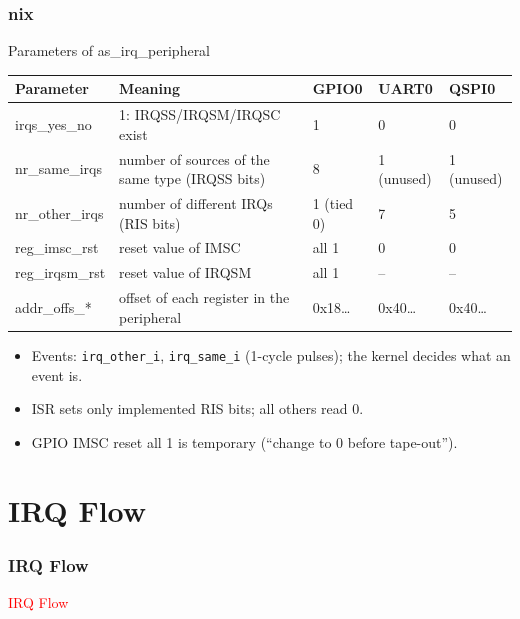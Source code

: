 \documentclass{beamer}
\newcommand{\astitle}{nix}
\newcommand{\assubtitle}{nix}
\newcommand{\cmd}[1]{\texttt{#1}}
\begin{document}
\renewcommand{\assubtitle}{Parameters of as\_irq\_peripheral}
\begin{frame}
\frametitle{\astitle}
\begin{block}{\assubtitle}
{\scriptsize
\begin{tabularx}{\textwidth}{|l|Y|l|l|l|}
  \hline
  \textbf{Parameter} & \textbf{Meaning} & \textbf{GPIO0} & \textbf{UART0} & \textbf{QSPI0} \\
  \hline
  \hline
  irqs\_yes\_no   & 1: IRQSS/IRQSM/IRQSC exist & 1 & 0 & 0 \\
  \hline
  nr\_same\_irqs  & number of sources of the same type (IRQSS bits) & 8 & 1 (unused) & 1 (unused) \\
  \hline
  nr\_other\_irqs & number of different IRQs (RIS bits) & 1 (tied 0) & 7 & 5 \\
  \hline
  reg\_imsc\_rst  & reset value of IMSC & all 1 & 0 & 0 \\
  \hline
  reg\_irqsm\_rst & reset value of IRQSM & all 1 & -- & -- \\
  \hline
  addr\_offs\_*   & offset of each register in the peripheral & 0x18\ldots & 0x40\ldots & 0x40\ldots \\
  \hline
\end{tabularx}}
\end{block}
  \begin{itemize}
    \item Events: \cmd{irq\_other\_i}, \cmd{irq\_same\_i} (1-cycle pulses);
      the kernel decides what an event is.
    \item ISR sets only implemented RIS bits; all others read 0.
    \item GPIO IMSC reset all 1 is temporary (``change to 0 before tape-out'').
  \end{itemize}
\end{frame}

\section{IRQ Flow}
\renewcommand{\astitle}{IRQ Flow}
\begin{frame}
\frametitle{\astitle}
\textcolor{red}{IRQ Flow}
\end{frame}
\end{document}
